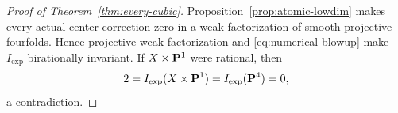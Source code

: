 \begin{proof}[Proof of Theorem~\ref{thm:every-cubic}]
Proposition~\ref{prop:atomic-lowdim} makes every actual center correction zero
in a weak factorization of smooth projective fourfolds.  Hence
projective weak factorization and
\eqref{eq:numerical-blowup} make \(I_{\mathrm{exp}}\) birationally
invariant.  If \(X\times\mathbf P^1\) were rational, then
\[
 2=I_{\mathrm{exp}}(X\times\mathbf P^1)
 =I_{\mathrm{exp}}(\mathbf P^4)=0,
\]
a contradiction.
%
%
%
\end{proof}
